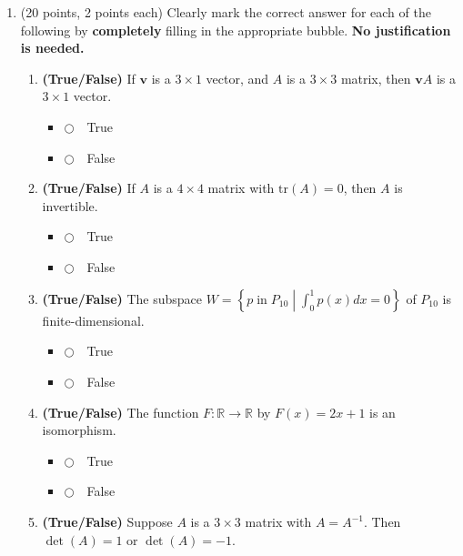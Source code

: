 \documentclass[12pt]{extarticle}
\newcommand{\chooseone}{{\Large$\Circle$\ \ }}
\begin{document}
\begin{enumerate}
\begin{itemize}
\vspace{2in}
\end{itemize}



\newpage




  \item (20 points, 2 points each)  Clearly mark the correct answer for each of the following by \textbf{completely} filling in the appropriate bubble.  \textbf{No justification is needed.}
\begin{enumerate}[label=\alph*.]
\item \textbf{(True/False)} If $\mathbf{v}$ is a $3\times 1$ vector, and $A$ is a $3\times 3$ matrix, then $\mathbf{v}A$ is a $3\times 1$ vector.
\begin{itemize}[label={}]
\item \chooseone True
\item \chooseone False
\end{itemize}


\vfill

\item \textbf{(True/False)} If $A$ is a $4\times 4$ matrix with $\mathrm{tr}(A)=0$, then $A$ is invertible.
\begin{itemize}[label={}] 
\item \chooseone True
\item \chooseone False
\end{itemize}
\vfill

\item \textbf{(True/False)} The subspace $W=\left\{p\; \text{in}\; P_{10}\middle|\displaystyle \int_0^1  p(x)dx=0\right\}$ of $P_{10}$ is finite-dimensional.
\begin{itemize}[label={}] 
\item \chooseone True
\item \chooseone False
\end{itemize}
\vfill

\item \textbf{(True/False)} The function $F:\mathbb{R}\to\mathbb{R}$ by $F(x)=2x+1$ is an isomorphism.
\begin{itemize}[label={}] 
\item \chooseone True
\item \chooseone False
\end{itemize}
\vfill

\item  \textbf{(True/False)} Suppose $A$ is a $3\times3$ matrix with $A=A^{-1}$. Then $\det(A)=1$ or $\det(A)=-1$.


\end{enumerate}
\end{enumerate}
\end{document}
